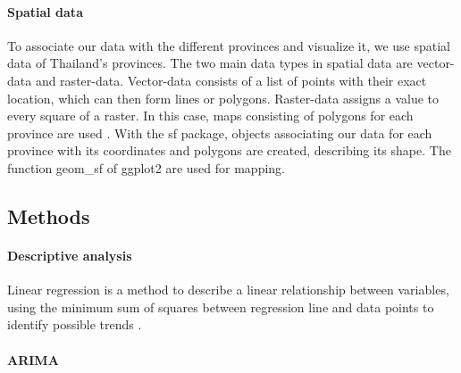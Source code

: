 	\paragraph{Spatial data}
	To associate our data with the different provinces and visualize it, we use spatial data of Thailand’s provinces. The two main data types in spatial data are vector-data and raster-data. Vector-data consists of a list of points with their exact location, which can then form lines or polygons. Raster-data assigns a value to every square of a raster. In this case, maps consisting of polygons for each province are used \citep{sds}. With the sf package, objects associating our data for each province with its coordinates and polygons are created, describing its shape. The function geom\_sf of ggplot2 are used for mapping. 
	
	\subsection{Methods}
	
	\paragraph{Descriptive analysis}
	Linear regression is a method to describe a linear relationship between variables, using the minimum sum of squares between regression line and data points to identify possible trends \citep{Schneider2010}. 


	\paragraph{ARIMA}
